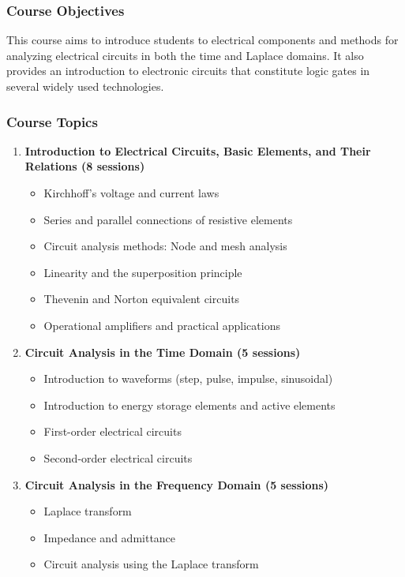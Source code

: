 \documentclass[12pt]{article}
\begin{document}
\subsubsection*{Course Objectives}
This course aims to introduce students to electrical components and methods for analyzing electrical circuits in both the time and Laplace domains. It also provides an introduction to electronic circuits that constitute logic gates in several widely used technologies.

\subsubsection*{Course Topics}
\begin{enumerate}
    \item \textbf{Introduction to Electrical Circuits, Basic Elements, and Their Relations (8 sessions)}
    \begin{itemize}
        \item Kirchhoff's voltage and current laws
        \item Series and parallel connections of resistive elements
        \item Circuit analysis methods: Node and mesh analysis
        \item Linearity and the superposition principle
        \item Thevenin and Norton equivalent circuits
        \item Operational amplifiers and practical applications
    \end{itemize}
    \item \textbf{Circuit Analysis in the Time Domain (5 sessions)}
    \begin{itemize}
        \item Introduction to waveforms (step, pulse, impulse, sinusoidal)
        \item Introduction to energy storage elements and active elements
        \item First-order electrical circuits
        \item Second-order electrical circuits
    \end{itemize}
    \item \textbf{Circuit Analysis in the Frequency Domain (5 sessions)}
    \begin{itemize}
        \item Laplace transform
        \item Impedance and admittance
        \item Circuit analysis using the Laplace transform

\end{itemize}
\end{enumerate}
\end{document}

